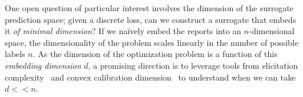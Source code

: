 \documentclass[12pt]{article}
\newcommand{\Comments}{1}
\newcommand{\mynote}[2]{\ifnum\Comments=1\textcolor{#1}{#2}\fi}
\newcommand{\jessie}[1]{\mynote{purple}{[JF: #1]}}
\newcommand{\reals}{\mathbb{R}}
\begin{document}
%
%


One open question of particular interest involves the dimension of the surrogate prediction space; given a discrete loss, can we construct a surrogate that embeds it \emph{of minimal dimension}?
If we na\"ively embed the reports into an $n$-dimensional space, the dimensionality of the problem scales linearly in the number of possible labels $n$.
As the dimension of the optimization problem is a function of this \emph{embedding dimension} $d$, a promising direction is to leverage tools from elicitation complexity~\cite{lambert2008eliciting,frongillo2015elicitation} and convex calibration dimension~\cite{ramaswamy2016convex} to understand when we can take $d <\!\!< n$.
\end{document}
